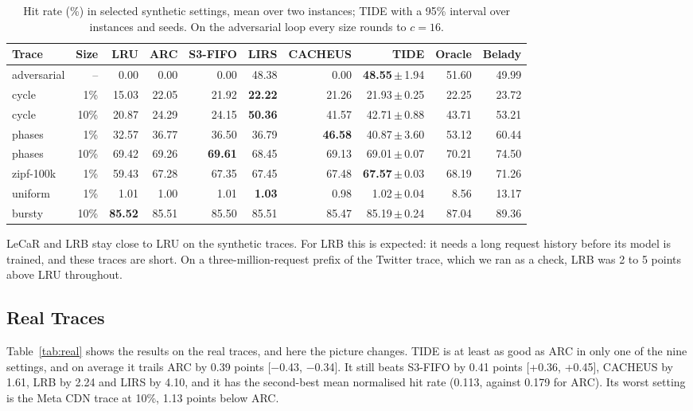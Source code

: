 \documentclass{llncs}
\begin{document}
\begin{table}[htbp]
\centering
\caption{Hit rate (\%) in selected synthetic settings, mean over two instances; TIDE with a 95\% interval over instances and seeds. On the adversarial loop every size rounds to $c = 16$.}
\label{tab:cells}
\setlength{\tabcolsep}{3pt}
\scriptsize
\begin{tabular}{lrrrrrrrrr}
\toprule
Trace & Size & LRU & ARC & S3-FIFO & LIRS & CACHEUS & TIDE & Oracle & Belady \\
\midrule
adversarial & -- & 0.00 & 0.00 & 0.00 & 48.38 & 0.00 & \textbf{48.55}\,$\pm$\,1.94 & 51.60 & 49.99 \\
cycle & 1\% & 15.03 & 22.05 & 21.92 & \textbf{22.22} & 21.26 & 21.93\,$\pm$\,0.25 & 22.25 & 23.72 \\
cycle & 10\% & 20.87 & 24.29 & 24.15 & \textbf{50.36} & 41.57 & 42.71\,$\pm$\,0.88 & 43.71 & 53.21 \\
phases & 1\% & 32.57 & 36.77 & 36.50 & 36.79 & \textbf{46.58} & 40.87\,$\pm$\,3.60 & 53.12 & 60.44 \\
phases & 10\% & 69.42 & 69.26 & \textbf{69.61} & 68.45 & 69.13 & 69.01\,$\pm$\,0.07 & 70.21 & 74.50 \\
zipf-100k & 1\% & 59.43 & 67.28 & 67.35 & 67.45 & 67.48 & \textbf{67.57}\,$\pm$\,0.03 & 68.19 & 71.26 \\
uniform & 1\% & 1.01 & 1.00 & 1.01 & \textbf{1.03} & 0.98 & 1.02\,$\pm$\,0.04 & 8.56 & 13.17 \\
bursty & 10\% & \textbf{85.52} & 85.51 & 85.50 & 85.51 & 85.47 & 85.19\,$\pm$\,0.24 & 87.04 & 89.36 \\
\bottomrule
\end{tabular}
\end{table}

LeCaR and LRB stay close to LRU on the synthetic traces. For LRB this is expected: it needs a long request history before its model is trained, and these traces are short. On a three-million-request prefix of the Twitter trace, which we ran as a check, LRB was 2 to 5 points above LRU throughout.

\subsection{Real Traces}

Table~\ref{tab:real} shows the results on the real traces, and here the picture changes. TIDE is at least as good as ARC in only one of the nine settings, and on average it trails ARC by 0.39 points [$-$0.43, $-$0.34]. It still beats S3-FIFO by 0.41 points [+0.36, +0.45], CACHEUS by 1.61, LRB by 2.24 and LIRS by 4.10, and it has the second-best mean normalised hit rate (0.113, against 0.179 for ARC). Its worst setting is the Meta CDN trace at 10\%, 1.13 points below ARC.
\end{document}
